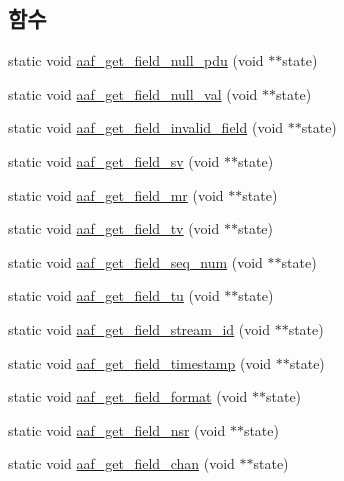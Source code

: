 \subsection*{함수}
\begin{DoxyCompactItemize}
\item 
static void \hyperlink{test-aaf_8c_a75facf8c2c4fddd477fa47494275e969}{aaf\+\_\+get\+\_\+field\+\_\+null\+\_\+pdu} (void $\ast$$\ast$state)
\item 
static void \hyperlink{test-aaf_8c_a6458b9edde5be98c38e55b696f7040f1}{aaf\+\_\+get\+\_\+field\+\_\+null\+\_\+val} (void $\ast$$\ast$state)
\item 
static void \hyperlink{test-aaf_8c_a054bb74ce98e26ae469dd4a276199b7a}{aaf\+\_\+get\+\_\+field\+\_\+invalid\+\_\+field} (void $\ast$$\ast$state)
\item 
static void \hyperlink{test-aaf_8c_a08d8dd939835e3fbcead2f7e1b565080}{aaf\+\_\+get\+\_\+field\+\_\+sv} (void $\ast$$\ast$state)
\item 
static void \hyperlink{test-aaf_8c_a193c8c98b601c2f340da5917f0d76aef}{aaf\+\_\+get\+\_\+field\+\_\+mr} (void $\ast$$\ast$state)
\item 
static void \hyperlink{test-aaf_8c_af3fe938b79f95379ef102e6fcb79a05c}{aaf\+\_\+get\+\_\+field\+\_\+tv} (void $\ast$$\ast$state)
\item 
static void \hyperlink{test-aaf_8c_a8310180bf237665f879b2894bdd4ab2c}{aaf\+\_\+get\+\_\+field\+\_\+seq\+\_\+num} (void $\ast$$\ast$state)
\item 
static void \hyperlink{test-aaf_8c_aa66b93a88e5f409a1b05a9b0eb838711}{aaf\+\_\+get\+\_\+field\+\_\+tu} (void $\ast$$\ast$state)
\item 
static void \hyperlink{test-aaf_8c_a6a17b66f03bb1f1a9d18ca5523a892a4}{aaf\+\_\+get\+\_\+field\+\_\+stream\+\_\+id} (void $\ast$$\ast$state)
\item 
static void \hyperlink{test-aaf_8c_a1ae5f104cb632794ffb6260429d9526c}{aaf\+\_\+get\+\_\+field\+\_\+timestamp} (void $\ast$$\ast$state)
\item 
static void \hyperlink{test-aaf_8c_ab87ddb0c54f5f45557b6567db2e16012}{aaf\+\_\+get\+\_\+field\+\_\+format} (void $\ast$$\ast$state)
\item 
static void \hyperlink{test-aaf_8c_aafc809db6c29ba25762ab1028f8a6a26}{aaf\+\_\+get\+\_\+field\+\_\+nsr} (void $\ast$$\ast$state)
\item 
static void \hyperlink{test-aaf_8c_ae21ae6143c92aa007dd7a7867eb7b3ac}{aaf\+\_\+get\+\_\+field\+\_\+chan} (void $\ast$$\ast$state)
\item 
$$
\end{DoxyCompactItemize}
